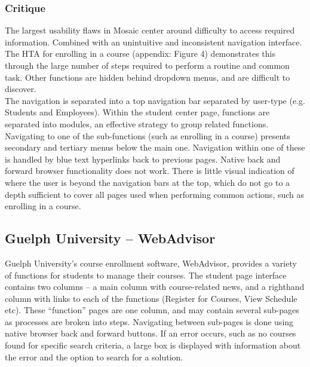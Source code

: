 \documentclass[10pt]{article}
\begin{document}
\begin{multicols}{2}
\subsubsection*{Critique}
The largest usability flaws in Mosaic center around difficulty to access 
required information. Combined with an unintuitive and inconsistent navigation 
interface. The HTA for enrolling in a course (appendix: Figure 4) demonstrates this 
through the large number of steps required to perform a routine and common task. 
Other functions are hidden behind dropdown menus, and are difficult to discover.\\

The navigation is separated into a top navigation bar separated by user-type 
(e.g. Students and Employees). Within the student center page, functions are 
separated into modules, an effective strategy to group related functions. 
Navigating to one of the sub-functions (such as enrolling in a course) presents 
secondary and tertiary menus below the main one. Navigation within one of these 
is handled by blue text hyperlinks back to previous pages. Native back and 
forward browser functionality does not work. There is little visual indication 
of where the user is beyond the navigation bars at the top, which do not go to a 
depth sufficient to cover all pages used when performing common actions, such as 
enrolling in a course.

\subsection*{Guelph University -- WebAdvisor}
Guelph University's course enrollment software, WebAdvisor, provides a variety 
of functions for students to manage their courses. The student page interface 
contains two columns -- a main column with course-related news, and a righthand 
column with links to each of the functions (Register for Courses, View Schedule 
etc). These ``function'' pages are one column, and may contain several sub-pages 
as processes are broken into steps. Navigating between sub-pages is done using 
native browser back and forward buttons. If an error occurs, such as no courses 
found for specific search criteria, a large box is displayed with information 
about the error and the option to search for a solution.


\end{multicols}
\end{document}
